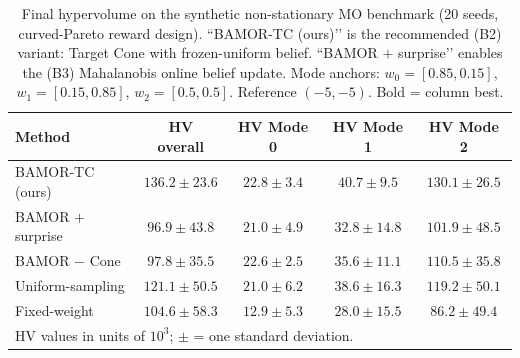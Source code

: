 \begin{table}[t]
\centering\small
\caption{Final hypervolume on the synthetic non-stationary MO benchmark (20 seeds, curved-Pareto reward design). ``BAMOR-TC (ours)\textquoteright\textquoteright{} is the recommended (B2) variant: Target Cone with frozen-uniform belief. ``BAMOR $+$ surprise\textquoteright\textquoteright{} enables the (B3) Mahalanobis online belief update. Mode anchors: $w_0{=}[0.85,0.15]$, $w_1{=}[0.15,0.85]$, $w_2{=}[0.5,0.5]$. Reference $(-5,-5)$. Bold = column best.}
\label{tab:main_results}
\begin{tabular}{lcccc}
\toprule
Method & HV overall & HV Mode 0 & HV Mode 1 & HV Mode 2 \\
\midrule
BAMOR-TC (ours) & \textbf{$136.2{\pm}23.6$} & \textbf{$22.8{\pm}3.4$} & \textbf{$40.7{\pm}9.5$} & \textbf{$130.1{\pm}26.5$} \\
BAMOR $+$ surprise & $96.9{\pm}43.8$ & $21.0{\pm}4.9$ & $32.8{\pm}14.8$ & $101.9{\pm}48.5$ \\
BAMOR $-$ Cone & $97.8{\pm}35.5$ & $22.6{\pm}2.5$ & $35.6{\pm}11.1$ & $110.5{\pm}35.8$ \\
Uniform-sampling & $121.1{\pm}50.5$ & $21.0{\pm}6.2$ & $38.6{\pm}16.3$ & $119.2{\pm}50.1$ \\
Fixed-weight & $104.6{\pm}58.3$ & $12.9{\pm}5.3$ & $28.0{\pm}15.5$ & $86.2{\pm}49.4$ \\
\bottomrule
\multicolumn{5}{l}{\footnotesize HV values in units of $10^3$; $\pm$ = one standard deviation.}
\end{tabular}
\end{table}